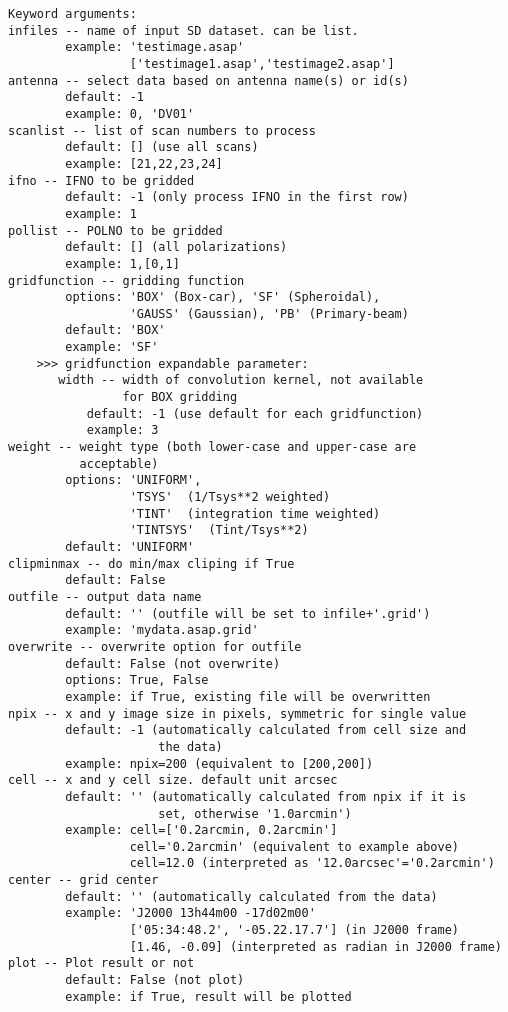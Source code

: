\begin{verbatim}
Keyword arguments:
infiles -- name of input SD dataset. can be list.
        example: 'testimage.asap' 
                 ['testimage1.asap','testimage2.asap']
antenna -- select data based on antenna name(s) or id(s)
        default: -1
        example: 0, 'DV01'
scanlist -- list of scan numbers to process
        default: [] (use all scans)
        example: [21,22,23,24]
ifno -- IFNO to be gridded
        default: -1 (only process IFNO in the first row)
        example: 1
pollist -- POLNO to be gridded
        default: [] (all polarizations)
        example: 1,[0,1]
gridfunction -- gridding function 
        options: 'BOX' (Box-car), 'SF' (Spheroidal), 
                 'GAUSS' (Gaussian), 'PB' (Primary-beam)
        default: 'BOX'
        example: 'SF'
    >>> gridfunction expandable parameter:
       width -- width of convolution kernel, not available 
                for BOX gridding
           default: -1 (use default for each gridfunction)
           example: 3
weight -- weight type (both lower-case and upper-case are 
          acceptable)
        options: 'UNIFORM',
                 'TSYS'  (1/Tsys**2 weighted)
                 'TINT'  (integration time weighted)
                 'TINTSYS'  (Tint/Tsys**2)
        default: 'UNIFORM'
clipminmax -- do min/max cliping if True
        default: False
outfile -- output data name
        default: '' (outfile will be set to infile+'.grid')
        example: 'mydata.asap.grid'
overwrite -- overwrite option for outfile
        default: False (not overwrite)
        options: True, False
        example: if True, existing file will be overwritten
npix -- x and y image size in pixels, symmetric for single value
        default: -1 (automatically calculated from cell size and 
                     the data)
        example: npix=200 (equivalent to [200,200])
cell -- x and y cell size. default unit arcsec
        default: '' (automatically calculated from npix if it is 
                     set, otherwise '1.0arcmin')
        example: cell=['0.2arcmin, 0.2arcmin']
                 cell='0.2arcmin' (equivalent to example above)
                 cell=12.0 (interpreted as '12.0arcsec'='0.2arcmin')
center -- grid center
        default: '' (automatically calculated from the data)
        example: 'J2000 13h44m00 -17d02m00'
                 ['05:34:48.2', '-05.22.17.7'] (in J2000 frame)
                 [1.46, -0.09] (interpreted as radian in J2000 frame)
plot -- Plot result or not
        default: False (not plot)
        example: if True, result will be plotted
\end{verbatim}

